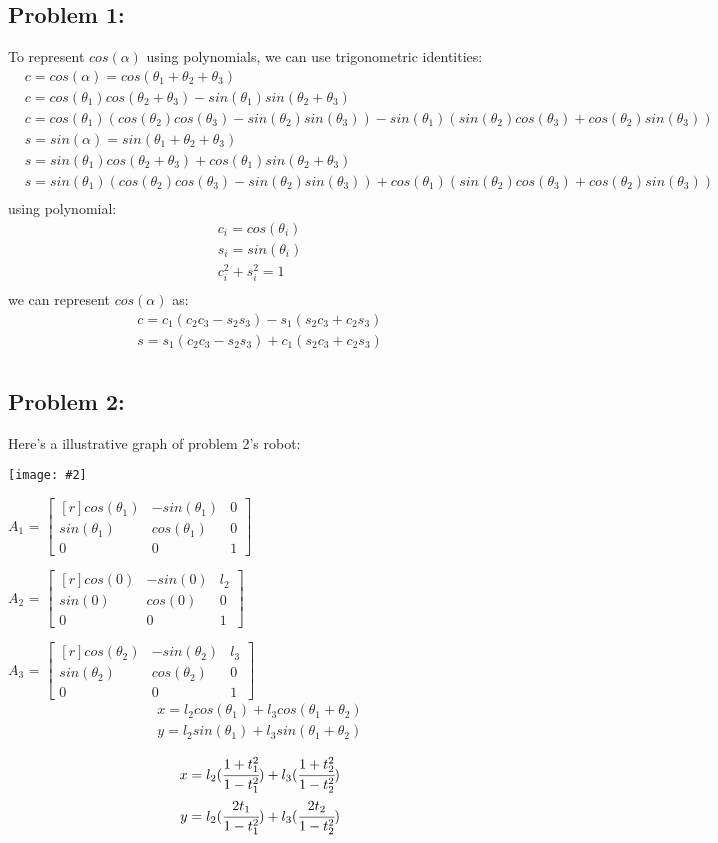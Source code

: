 \documentclass[11pt]{article}
\newcommand{\image}[2]{\texttt{[image: \#2]}}
\newcommand{\mat}[1]{
    $\begin{bmatrix*}[r]
        #1
    \end{bmatrix*}$
} %
\newcommand{\myalign}[1]{\begin{align*}#1\end{align*}}
\begin{document}
\subsection{Problem 1:}
To represent $cos(\alpha)$ using  polynomials, we can use trigonometric identities:
\myalign{
    & c = cos(\alpha) = cos(\theta_1 +\theta_2 + \theta_3) \\
    & c = cos(\theta_1)cos(\theta_2+\theta_3)-sin(\theta_1)sin(\theta_2+\theta_3) \\
    & c = cos(\theta_1)(cos(\theta_2)cos(\theta_3)-sin(\theta_2)sin(\theta_3))-sin(\theta_1)(sin(\theta_2)cos(\theta_3)+cos(\theta_2)sin(\theta_3)) \\
    & s = sin(\alpha) = sin(\theta_1 + \theta_2 + \theta_3) \\
    & s = sin(\theta_1)cos(\theta_2+\theta_3)+cos(\theta_1)sin(\theta_2+\theta_3) \\
    & s = sin(\theta_1)(cos(\theta_2)cos(\theta_3)-sin(\theta_2)sin(\theta_3))+cos(\theta_1)(sin(\theta_2)cos(\theta_3)+cos(\theta_2)sin(\theta_3)) \\
}
using polynomial:
\myalign{
    c_i = cos(\theta_i) \\
    s_i = sin(\theta_i) \\
    c_i^2 + s_i^2 = 1 \\
}
we can represent $cos(\alpha)$ as:
\myalign{
    c = c_1(c_2c_3-s_2s_3)-s_1(s_2c_3+c_2s_3) \\
    s = s_1(c_2c_3-s_2s_3)+c_1(s_2c_3+c_2s_3) \\
}
\subsection{Problem 2:}
Here's a illustrative graph of problem 2's robot: \\
\begin{center}
    \image{0.15}{img4}
\end{center}
$A_1$ = \mat{
    cos(\theta_1) & -sin(\theta_1) & 0 \\
    sin(\theta_1) & cos(\theta_1) & 0 \\
    0 & 0 & 1
} 
$A_2$ = \mat{
    cos(0) & -sin(0) & l_2 \\
    sin(0) & cos(0) & 0 \\
    0 & 0 & 1
} 
$A_3$ = \mat{
    cos(\theta_2) & -sin(\theta_2) & l_3 \\
    sin(\theta_2) & cos(\theta_2) & 0 \\
    0 & 0 & 1
} \\
\myalign{
    x = l_2cos(\theta_1)+l_3cos(\theta_1+\theta_2) \\
    y = l_2sin(\theta_1)+l_3sin(\theta_1+\theta_2) \\
}
\myalign{
    x = l_2(\cfrac{1+t_1^2}{1-t_1^2})+l_3(\cfrac{1+t_2^2}{1-t_2^2}) \\
    y = l_2(\cfrac{2t_1}{1-t_1^2})+l_3(\cfrac{2t_2}{1-t_2^2}) \\
}
\end{document}
